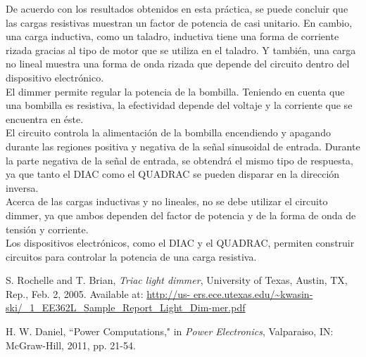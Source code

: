 \documentclass[journal]{IEEEtran}
\begin{document}
De acuerdo con los resultados obtenidos en esta práctica, 
se puede concluir que las cargas resistivas muestran 
un factor de potencia de 
casi unitario. En cambio, una carga inductiva, como un 
taladro, inductiva tiene una forma de 
corriente rizada gracias al tipo de motor que se 
utiliza en el taladro. Y también, una carga no lineal 
muestra una forma de onda rizada que depende del circuito 
dentro del dispositivo electrónico. \\

El dimmer permite regular la potencia de la bombilla. 
Teniendo en cuenta que una bombilla es resistiva, la 
efectividad depende del voltaje y la corriente que se 
encuentra en éste. \\

El circuito controla la alimentación de la bombilla 
encendiendo y apagando durante las regiones positiva y 
negativa de la señal sinusoidal de entrada. Durante 
la parte negativa de la señal de entrada, se obtendrá 
el mismo tipo de respuesta, ya que tanto el DIAC como 
el QUADRAC se pueden disparar en la dirección inversa. \\

Acerca de las cargas inductivas y no lineales, no se 
debe utilizar el circuito dimmer, ya que ambos dependen 
del factor de potencia y de la forma de onda de tensión 
y corriente. \\

Los dispositivos electrónicos, como el DIAC y el QUADRAC, 
permiten construir circuitos para controlar la potencia 
de una carga resistiva.

\begin{thebibliography}{1}

S. Rochelle and T. Brian, \textit{Triac light dimmer}, University of Texas, Austin, TX, Rep., Feb. 2, 2005. Available at: 
\url{http://us- ers.ece.utexas.edu/~kwasin-ski/_1_EE362L_Sample_Report_Light_Dim-mer.pdf }

H. W. Daniel, “Power Computations," in \textit{Power Electronics}, Valparaiso, IN: McGraw-Hill, 2011, pp. 21-54.

\end{thebibliography}
\end{document}
